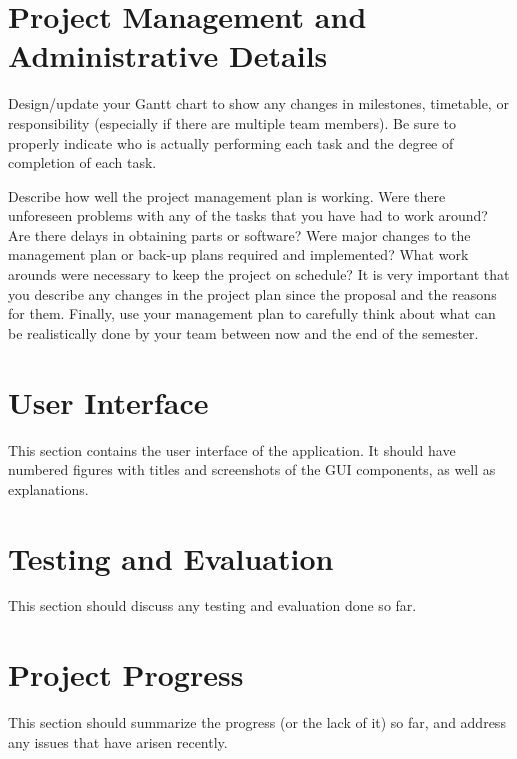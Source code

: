 \documentclass[letterpaper,12pt]{article}
\begin{document}
\label{software_requirements}
\label{software_specifications}
\label{software_design}

\newpage



\section{Project Management and Administrative Details}
Design/update your Gantt chart to show any changes in milestones, timetable, or
responsibility (especially if there are multiple team members). Be sure to
properly indicate who is actually performing each task and the degree of
completion of each task.

Describe how well the project management plan is working. Were there unforeseen
problems with any of the tasks that you have had to work around? Are there
delays in obtaining parts or software? Were major changes to the management plan
or back-up plans required and implemented? What work arounds were necessary to
keep the project on schedule? It is very important that you describe any changes
in the project plan since the proposal and the reasons for them.
Finally, use your management plan to carefully think about what can be
realistically done by your team between now and the end of the semester.

\newpage



\section{User Interface}
This section contains the user interface of the application. It should have
numbered figures with titles and screenshots of the GUI components, as well as
explanations.

\newpage



\section{Testing and Evaluation}
This section should discuss any testing and evaluation done so far.

\newpage



\section{Project Progress}
This section should summarize the progress (or the lack of it) so far, and
address any issues that have arisen recently.
\end{document}
